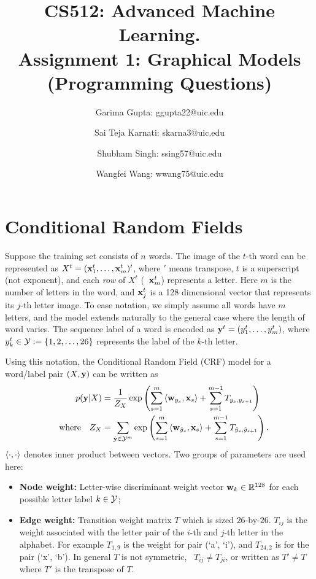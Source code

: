\documentclass[11pt]{report}
\begin{document}
\title{
  CS512: Advanced Machine Learning. \\
  \large Assignment 1: Graphical Models (Programming Questions)}

\author{Garima Gupta: ggupta22@uic.edu \and Sai Teja Karnati: skarna3@uic.edu \and
 Shubham Singh: ssing57@uic.edu \and Wangfei Wang: wwang75@uic.edu}

\maketitle

\section{Conditional Random Fields}

Suppose the training set consists of $n$ words.
The image of the $t$-th word can be represented as
$X^t = (\mathbf{\boldsymbol{x}}^t_1, \ldots, \mathbf{\boldsymbol{x}}^t_m)'$,
where $'$ means transpose,
$t$ is a superscript (not exponent),
and each \emph{row} of $X^t$ (\eg\ $\mathbf{\boldsymbol{x}}^t_m$) represents a letter.
Here $m$ is the number of letters in the word,
and $\mathbf{\boldsymbol{x}}^t_j$ is a 128 dimensional vector that represents its $j$-th letter image.
To ease notation, we simply assume all words have $m$ letters,
and the model extends naturally to the general case where the length of word varies.
The sequence label of a word is encoded as
$\mathbf{\boldsymbol{y}}^t = (y^t_1, \ldots, y^t_m)$,
where $y^t_k \in \mathcal{Y} := \{1, 2, \ldots, 26\}$ represents the label of the $k$-th letter.

Using this notation, the Conditional Random Field (CRF) model for a word/label pair $(X, \mathbf{\boldsymbol{y}})$ can be written as
\begin{align}
	\label{eq:crf}
	p(\mathbf{\boldsymbol{y}} | X ) &= \frac{1}{Z_X} \exp \left(\sum_{s=1}^m \left\langle \mathbf{\boldsymbol{w}}_{y_s},\mathbf{\boldsymbol{x}}_s \right\rangle + \sum_{s=1}^{m-1} T_{y_s, y_{s+1}}\right) \\
	{\quad \text{where} \quad} Z_X &= \sum_{\hat{\mathbf{\boldsymbol{y}}} \in \mathcal{Y}^m} \exp \left(\sum_{s=1}^m \left\langle \mathbf{\boldsymbol{w}}_{\hat{y}_s},\mathbf{\boldsymbol{x}}_s \right\rangle + \sum_{s=1}^{m-1} T_{\hat{y}_s, \hat{y}_{s+1}}\right).
\end{align}
%
$\left\langle \cdot,\cdot \right\rangle$ denotes inner product between vectors.
Two groups of parameters are used here:

\vspace{-1em}
\begin{itemize}
	\item {\bf Node weight:} Letter-wise discriminant weight vector $\mathbf{\boldsymbol{w}}_k \in \mathbb{R}^{128}$ for each possible letter label $k \in \mathcal{Y}$;
	\item {\bf Edge weight:} Transition weight matrix $T$ which is sized $26$-by-$26$.
	$T_{ij}$ is the weight associated with the letter pair of the $i$-th and $j$-th letter in the alphabet.  For example $T_{1,9}$ is the weight for pair (`a', `i'), and $T_{24,2}$ is for the pair (`x', `b'). In general $T$ is not symmetric, \ie\ $T_{ij} \neq T_{ji}$, or written as $T' \neq T$ where $T'$ is the transpose of $T$.
\end{itemize}
\end{document}
